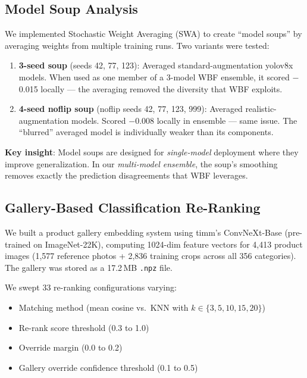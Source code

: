 \documentclass[11pt,a4paper]{article}
\begin{document}
\subsection{Model Soup Analysis}

We implemented Stochastic Weight Averaging (SWA) to create ``model soups'' by averaging weights from multiple training runs. Two variants were tested:

\begin{enumerate}
\item \textbf{3-seed soup} (seeds 42, 77, 123): Averaged standard-augmentation yolov8x models. When used as one member of a 3-model WBF ensemble, it scored $-$0.015 locally --- the averaging removed the diversity that WBF exploits.

\item \textbf{4-seed noflip soup} (noflip seeds 42, 77, 123, 999): Averaged realistic-augmentation models. Scored $-$0.008 locally in ensemble --- same issue. The ``blurred'' averaged model is individually weaker than its components.
\end{enumerate}

\textbf{Key insight}: Model soups are designed for \emph{single-model} deployment where they improve generalization. In our \emph{multi-model ensemble}, the soup's smoothing removes exactly the prediction disagreements that WBF leverages.

\subsection{Gallery-Based Classification Re-Ranking}

We built a product gallery embedding system using timm's ConvNeXt-Base (pre-trained on ImageNet-22K), computing 1024-dim feature vectors for 4,413 product images (1,577 reference photos + 2,836 training crops across all 356 categories). The gallery was stored as a 17.2\,MB \texttt{.npz} file.

We swept 33 re-ranking configurations varying:
\begin{itemize}
\item Matching method (mean cosine vs.\ KNN with $k \in \{3, 5, 10, 15, 20\}$)
\item Re-rank score threshold (0.3 to 1.0)
\item Override margin (0.0 to 0.2)
\item Gallery override confidence threshold (0.1 to 0.5)
\end{itemize}
\end{document}
